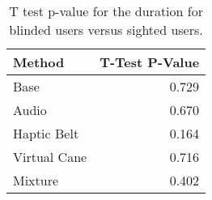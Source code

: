 
\begin{table}[!htb]
\centering
\caption{T test p-value for the duration for blinded users versus sighted users.}
\label{tab:ttest_duration}
\begin{tabular}{lr}
\toprule
      Method &  T-Test P-Value \\
\midrule
        Base &           0.729 \\
       Audio &           0.670 \\
 Haptic Belt &           0.164 \\
Virtual Cane &           0.716 \\
     Mixture &           0.402 \\
\bottomrule
\end{tabular}
\end{table}


